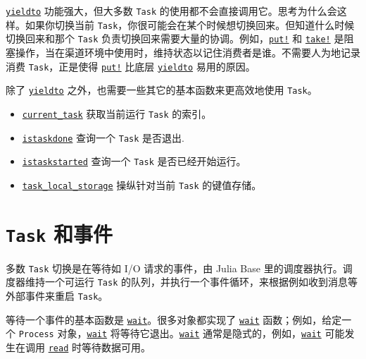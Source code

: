 \hyperlink{4920987536368477483}{\texttt{yieldto}} 功能强大，但大多数 \texttt{Task} 的使用都不会直接调用它。思考为什么会这样。如果你切换当前 \texttt{Task}，你很可能会在某个时候想切换回来。但知道什么时候切换回来和那个 \texttt{Task} 负责切换回来需要大量的协调。例如，\hyperlink{10812715779190652189}{\texttt{put!}} 和 \hyperlink{4963355246106153560}{\texttt{take!}} 是阻塞操作，当在渠道环境中使用时，维持状态以记住消费者是谁。不需要人为地记录消费 \texttt{Task}，正是使得 \hyperlink{10812715779190652189}{\texttt{put!}} 比底层 \hyperlink{4920987536368477483}{\texttt{yieldto}} 易用的原因。



除了 \hyperlink{4920987536368477483}{\texttt{yieldto}} 之外，也需要一些其它的基本函数来更高效地使用 \texttt{Task}。



\begin{itemize}
\item \hyperlink{12929971401717674174}{\texttt{current\_task}} 获取当前运行 \texttt{Task} 的索引。


\item \hyperlink{7432450399685996831}{\texttt{istaskdone}} 查询一个 \texttt{Task} 是否退出.


\item \hyperlink{188637489024602838}{\texttt{istaskstarted}} 查询一个 \texttt{Task} 是否已经开始运行。


\item \hyperlink{8292907206163344794}{\texttt{task\_local\_storage}} 操纵针对当前 \texttt{Task} 的键值存储。

\end{itemize}


\hypertarget{18351392990270521875}{}


\section{\texttt{Task} 和事件}



多数 \texttt{Task} 切换是在等待如 I/O 请求的事件，由 Julia Base 里的调度器执行。调度器维持一个可运行 \texttt{Task} 的队列，并执行一个事件循环，来根据例如收到消息等外部事件来重启 \texttt{Task}。



等待一个事件的基本函数是 \hyperlink{13761789780433862250}{\texttt{wait}}。很多对象都实现了 \hyperlink{13761789780433862250}{\texttt{wait}} 函数；例如，给定一个 \texttt{Process} 对象，\hyperlink{13761789780433862250}{\texttt{wait}} 将等待它退出。\hyperlink{13761789780433862250}{\texttt{wait}} 通常是隐式的，例如，\hyperlink{13761789780433862250}{\texttt{wait}} 可能发生在调用 \hyperlink{8104134490906192097}{\texttt{read}} 时等待数据可用。



